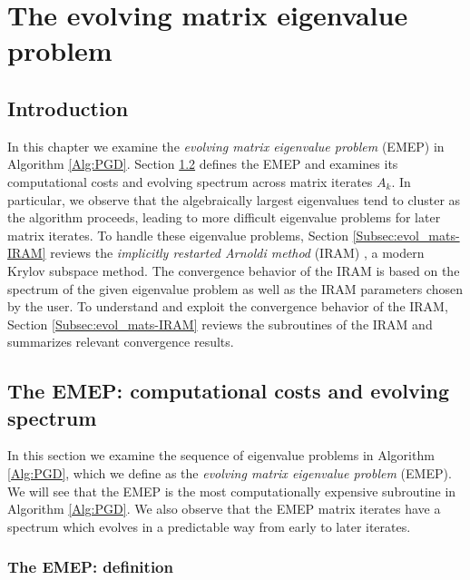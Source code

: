 \chapter{The evolving matrix eigenvalue problem}		\label{Sec:evol_mats}



\section{Introduction}   \label{Subsec:evol_mats-intro}


In this chapter we examine the \textit{evolving matrix eigenvalue problem} (EMEP) in Algorithm \ref{Alg:PGD}.  
Section \ref{Subsec:evol_mats-spectral_props} defines the EMEP and examines its computational costs and evolving spectrum across matrix iterates $A_k$.  
In particular, we observe that the algebraically largest eigenvalues tend to cluster as the algorithm proceeds, leading to more difficult eigenvalue problems for later matrix iterates.  
To handle these eigenvalue problems, Section \ref{Subsec:evol_mats-IRAM} reviews the \textit{implicitly restarted Arnoldi method} (IRAM) \cite{sorensen1992implicit}, a modern Krylov subspace method. 
The convergence behavior of the IRAM is based on the spectrum of the given eigenvalue problem as well as the IRAM parameters chosen by the user.
To understand and exploit the convergence behavior of the IRAM, Section \ref{Subsec:evol_mats-IRAM} reviews the subroutines of the IRAM and summarizes relevant convergence results.









\section{The EMEP: computational costs and evolving spectrum}		\label{Subsec:evol_mats-spectral_props}


In this section we examine the sequence of eigenvalue problems in Algorithm \ref{Alg:PGD}, which we define as the \textit{evolving matrix eigenvalue problem} (EMEP).
We will see that the EMEP is the most computationally expensive subroutine in Algorithm \ref{Alg:PGD}.  
We also observe that the EMEP matrix iterates have a spectrum which evolves in a predictable way from early to later iterates.




\subsection{The EMEP: definition} 	\label{Subsubsec:evol_mats-EMEP_definition}



